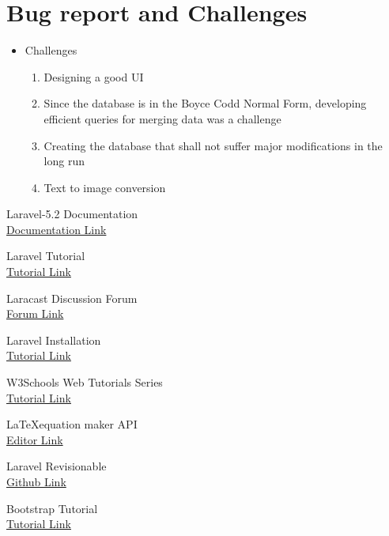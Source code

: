 \documentclass[a4paper,12pt,oneside]{book}
\begin{document}
\section{Bug report and Challenges}
    \begin{itemize}
      \item Challenges
         \begin{enumerate}
            \item Designing a good UI
            \item Since the database is in the Boyce Codd Normal Form, developing efficient queries for merging data was a challenge
           \item Creating the database that shall not suffer major modifications in the long run
           \item Text to image conversion
         \end{enumerate}
    \end{itemize}

\begin{thebibliography}{li}

	Laravel-5.2 Documentation\\
	\href{https://laravel.com/docs/5.2}{Documentation Link}

	Laravel Tutorial\\
	 \href{https://laracasts.com/series/laravel-5-from-scratch}{Tutorial Link}

	Laracast Discussion Forum\\
	\href{https://laracasts.com/discuss}{Forum Link}

	Laravel Installation\\
	\href{https://www.howtoforge.com/tutorial/install-laravel-on-ubuntu-for-apache/}{Tutorial Link}

	W3Schools Web Tutorials Series\\
	\href{http://www.w3schools.com/}{Tutorial Link}

	 \LaTeX equation maker API\\
	\href{https://www.codecogs.com/latex/eqneditor.php}{Editor Link}

	Laravel Revisionable \\
	\href{https://github.com/VentureCraft/revisionable}{Github Link}

	Bootstrap Tutorial \\
	\href{http://getbootstrap.com/getting-started/}{Tutorial Link}

\end{thebibliography}
\end{document}
